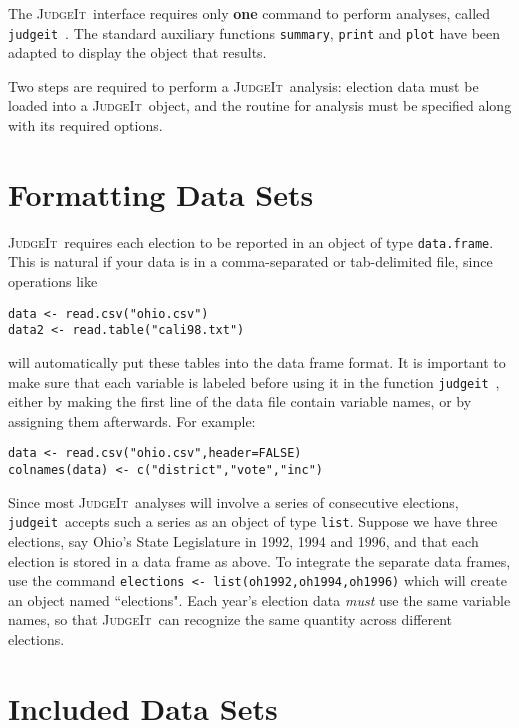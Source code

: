 \documentclass[oneside,letterpaper,titlepage]{article}
\newcommand{\JudgeIt}{\textsc{JudgeIt}\ }
\newcommand{\jud}{\texttt{judgeit}\ }
\begin{document}
The \JudgeIt interface requires only \textbf{one} command to perform
analyses, called \jud. The standard auxiliary functions
\texttt{summary}, \texttt{print} and \texttt{plot} have been adapted
to display the object that results.

Two steps are required to perform a \JudgeIt analysis: election data
must be loaded into a \JudgeIt object, and the routine for analysis
must be specified along with its required options.

\section{Formatting Data Sets}

\JudgeIt requires each election to be reported in an object of type
\texttt{data.frame}.  This is natural if your data is in a
comma-separated or tab-delimited file, since operations like
\begin{verbatim}
data <- read.csv("ohio.csv")
data2 <- read.table("cali98.txt")
\end{verbatim}
will automatically put these tables into the data frame format. It
is important to make sure that each variable is labeled before using
it in the function \jud, either by making the first line
of the data file contain variable names, or by assigning them afterwards.
For example:
\begin{verbatim}
data <- read.csv("ohio.csv",header=FALSE)
colnames(data) <- c("district","vote","inc")
\end{verbatim}

Since most \JudgeIt analyses will involve a series of consecutive
elections, \jud accepts such a series as an object of type
\texttt{list}. Suppose we have three elections, say Ohio's State
Legislature in 1992, 1994 and 1996, and that each election is stored
in a data frame as above. To integrate the separate data frames, use
the command \texttt{elections <- list(oh1992,oh1994,oh1996)} which
will create an object named ``elections".  Each year's election data
\emph{must} use the same variable names, so that \JudgeIt can recognize
the same quantity across different elections.

\section{Included Data Sets}
\end{document}
